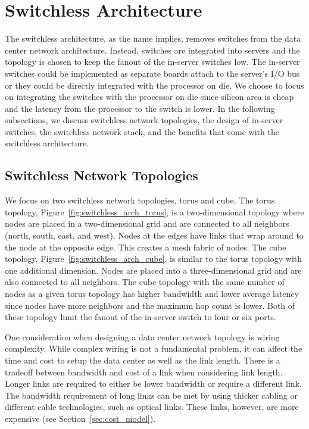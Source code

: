 \vspace{-0.1in}
\section{Switchless Architecture}
\label{sec:arch}

The switchless architecture, as the name implies, removes switches from the data center network architecture.  Instead, switches are integrated into servers and the topology is chosen to keep the fanout of the in-server switches low.  The in-server switches could be implemented as separate boards attach to the server's I/O bus or they could be directly integrated with the processor on die.  We choose to focus on integrating the switches with the processor on die since silicon area is cheap and the latency from the processor to the switch is lower.  In the following subsections, we discuss switchless network topologies, the design of in-server switches, the switchless network stack, and the benefits that come with the switchless architecture.

\subsection{Switchless Network Topologies}

We focus on two switchless network topologies, torus and cube.  The torus topology, Figure~\ref{fig:switchless_arch_torus}, is a two-dimensional topology where nodes are placed in a two-dimensional grid and are connected to all neighbors (north, south, east, and west).  Nodes at the edges have links that wrap around to the node at the opposite edge.  This creates a mesh fabric of nodes.  The cube topology, Figure~\ref{fig:switchless_arch_cube}, is similar to the torus topology with one additional dimension.  Nodes are placed into a three-dimensional grid and are also connected to all neighbors.  The cube topology with the same number of nodes as a given torus topology has higher bandwidth and lower average latency since nodes have more neighbors and the maximum hop count is lower.  Both of these topology limit the fanout of the in-server switch to four or six ports.

One consideration when designing a data center network topology is wiring complexity.  While complex wiring is not a fundamental problem, it can affect the time and cost to setup the data center as well as the link length.  There is a tradeoff between bandwidth and cost of a link when considering link length.  Longer links are required to either be lower bandwidth or require a different link.  The bandwidth requirement of long links can be met by using thicker cabling or different cable technologies, such as optical links.  These links, however, are more expensive (see Section~\ref{sec:cost_model}).

